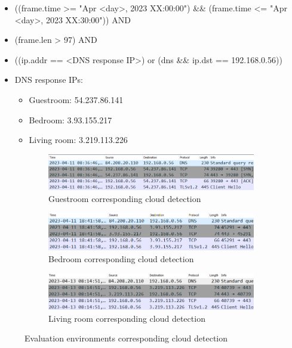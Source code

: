 \begin{itemize}
        \item ((frame.time >= "Apr <day>, 2023 XX:00:00") \&\& (frame.time <= "Apr <day>, 2023 XX:30:00")) AND
        \item (frame.len > 97) AND 
        \item  ((ip.addr == <DNS response IP>) or (dns \&\& ip.dst == 192.168.0.56))
       \item DNS response IPs:  \begin{itemize}
                                \item Guestroom: 54.237.86.141 
                                \item Bedroom: 3.93.155.217 
                                \item Living room: 3.219.113.226 
                            \end{itemize}
\end{itemize}

\begin{figure}[H]
    \centering
    
    \begin{subfigure}{0.80\textwidth}
        \centering
        \includegraphics[width=\linewidth]{figures/Evaluation_cloud_detection1.png}
        \caption{Guestroom corresponding cloud detection}
        \label{fig:Evaluation_coulddetection_1}
    \end{subfigure}
    \hfill
    \begin{subfigure}{0.80\textwidth}
        \centering
        \includegraphics[width=\linewidth]{figures/Evaluation_cloud_detection2.png}
        \caption{Bedroom corresponding cloud detection}
        \label{fig:Evaluation_clouddetection_2}
    \end{subfigure}
    \hfill
    \begin{subfigure}{0.80\textwidth}
        \centering
        \includegraphics[width=\linewidth]{figures/Evaluation_cloud_detection3.png}
        \caption{Living room corresponding cloud detection}
        \label{fig:Evaluation_clouddetection_3}
    \end{subfigure}
    
    \caption{Evaluation environments corresponding cloud detection}
    \label{fig:evaluation_corresponding_cloud}
\end{figure}

